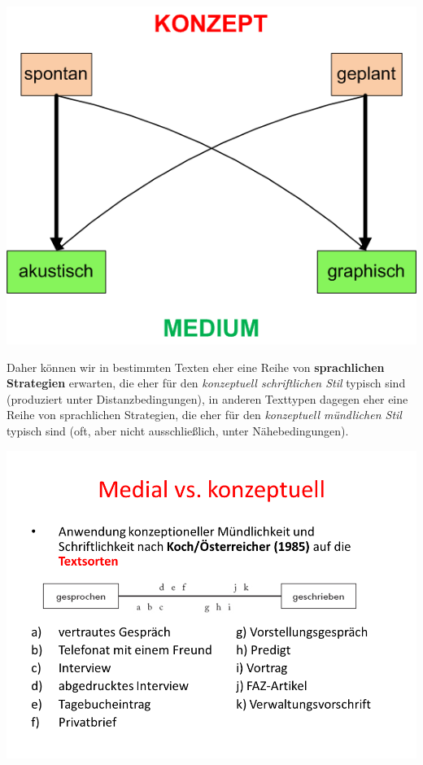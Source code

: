 \documentclass[
  letterpaper,
]{scrbook}
\begin{document}
\includegraphics[width=1\textwidth,height=\textheight]{./pictures/Naehe_Distanz_Viereck.png}

Daher können wir in bestimmten Texten eher eine Reihe von
\textbf{sprachlichen Strategien} erwarten, die eher für den
\emph{konzeptuell schriftlichen Stil} typisch sind (produziert unter
Distanzbedingungen), in anderen Texttypen dagegen eher eine Reihe von
sprachlichen Strategien, die eher für den \emph{konzeptuell mündlichen
Stil} typisch sind (oft, aber nicht ausschließlich, unter
Nähebedingungen).

\includegraphics[width=1\textwidth,height=\textheight]{./pictures/nahe_distanz_diagram2.png}
\end{document}
